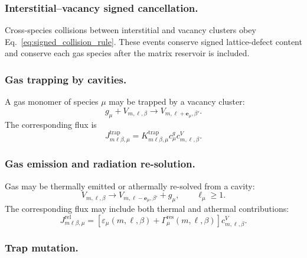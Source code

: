 \subsubsection*{Interstitial--vacancy signed cancellation.}

Cross-species collisions between interstitial and vacancy clusters obey
Eq.~\eqref{eq:signed_collision_rule}. These events conserve signed
lattice-defect content and conserve each gas species after the matrix reservoir
is included.

\subsubsection*{Gas trapping by cavities.}

A gas monomer of species $\mu$ may be trapped by a vacancy cluster:
\begin{equation}
    g_\mu
    +
    V_{m,\boldsymbol{\ell},\beta}
    \longrightarrow
    V_{m,\boldsymbol{\ell}+\mathbf{e}_\mu,\beta'} .
    \label{eq:gas_trapping}
\end{equation}
The corresponding flux is
\begin{equation}
    J^{\mathrm{trap}}_{m\boldsymbol{\ell}\beta,\mu}
    =
    K^{\mathrm{trap}}_{m\boldsymbol{\ell}\beta,\mu}
    c^g_\mu c^V_{m,\boldsymbol{\ell},\beta} .
\end{equation}

\subsubsection*{Gas emission and radiation re-solution.}

Gas may be thermally emitted or athermally re-solved from a cavity:
\begin{equation}
    V_{m,\boldsymbol{\ell},\beta}
    \longrightarrow
    V_{m,\boldsymbol{\ell}-\mathbf{e}_\mu,\beta'}
    +
    g_\mu,
    \qquad
    \ell_\mu\geq 1 .
    \label{eq:gas_emission_general}
\end{equation}
The corresponding flux may include both thermal and athermal contributions:
\begin{equation}
    J^{\mathrm{rel}}_{m\boldsymbol{\ell}\beta,\mu}
    =
    \left[
    \varepsilon_\mu(m,\boldsymbol{\ell},\beta)
    +
    \Gamma^{\mathrm{res}}_\mu(m,\boldsymbol{\ell},\beta)
    \right]
    c^V_{m,\boldsymbol{\ell},\beta} .
    \label{eq:gas_release_flux}
\end{equation}

\subsubsection*{Trap mutation.}

